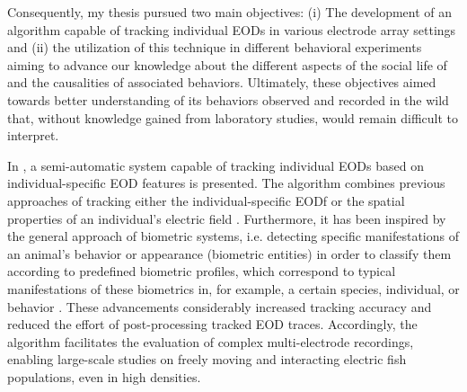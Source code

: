 Consequently, my thesis pursued two main objectives: (i) The development of an algorithm capable of tracking individual EODs in various electrode array settings and (ii) the utilization of this technique in different behavioral experiments aiming to advance our knowledge about the different aspects of the social life of \lepto{} and the causalities of associated behaviors. Ultimately, these objectives aimed towards better understanding of its behaviors observed and recorded in the wild that, without knowledge gained from laboratory studies, would remain difficult to interpret.

In , a semi-automatic system capable of tracking individual EODs based on individual-specific EOD features is presented. The algorithm combines previous approaches of tracking either the individual-specific EODf \citep{Henninger2020} or the spatial properties of an individual's electric field \citep{Madhav2018}. Furthermore, it has been inspired by the general approach of biometric systems, i.e. detecting specific manifestations of an animal's behavior or appearance (biometric entities) in order to classify them according to predefined biometric profiles, which correspond to typical manifestations of these biometrics in, for example, a certain species, individual, or behavior \citep{Gaston2004, Sherley2010,  Kuhl2013}. These advancements considerably increased tracking accuracy and reduced the effort of post-processing tracked EOD traces. Accordingly, the algorithm facilitates the evaluation of complex multi-electrode recordings, enabling large-scale studies on freely moving and interacting electric fish populations, even in high densities. 

